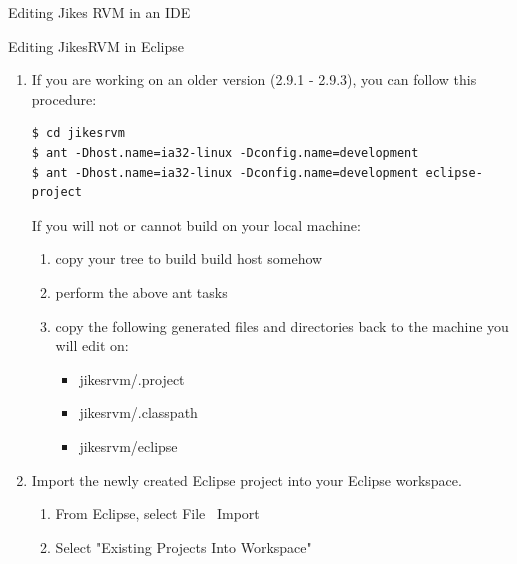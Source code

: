 \begin{section}{Editing Jikes RVM in an IDE}
\begin{subsection}{Editing JikesRVM in Eclipse}
\begin{enumerate}
     \item If you are working on an older version (2.9.1 - 2.9.3), you can follow this procedure:
       \begin{lstlisting}
$ cd jikesrvm
$ ant -Dhost.name=ia32-linux -Dconfig.name=development
$ ant -Dhost.name=ia32-linux -Dconfig.name=development eclipse-project
       \end{lstlisting}
        If you will not or cannot build on your local machine:
       \begin{enumerate}
         \item copy your tree to build build host somehow
         \item perform the above ant tasks
         \item copy the following generated files and directories back to the machine you will edit on:
           \begin{itemize}
             \item jikesrvm/.project
             \item jikesrvm/.classpath
             \item jikesrvm/eclipse
           \end{itemize}
       \end{enumerate}
  \item Import the newly created Eclipse project into your Eclipse workspace.
    \begin{enumerate}
      \item From Eclipse, select File \textrightarrow\ Import
      \item Select "Existing Projects Into Workspace"
        \begin{figure}[h]
          \centering

\end{figure}
\end{enumerate}
\end{enumerate}
\end{subsection}
\end{section}
